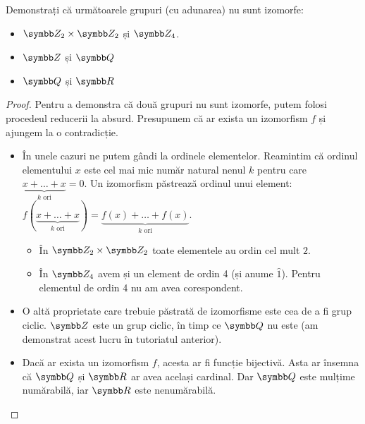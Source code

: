 \begin{exercise}
Demonstrați că următoarele grupuri (cu adunarea) nu sunt izomorfe:
\begin{itemize}
    \item \(\integersmod{2} \times \integersmod{2}\) și \(\integersmod{4}\).
    \item \(\integers\) și \(\rationals\)
    \item \(\rationals\) și \(\reals\)
\end{itemize}
\end{exercise}
\begin{proof}
Pentru a demonstra că două grupuri nu sunt izomorfe, putem folosi procedeul reducerii la absurd. Presupunem că ar exista un izomorfism \(f\) și ajungem la o contradicție.
\begin{itemize}
    \item În unele cazuri ne putem gândi la ordinele elementelor. Reamintim că ordinul elementului \(x\) este cel mai mic număr natural nenul \(k\) pentru care \(\underbrace{x + \dots + x}_{k \text{ ori}} = 0\). Un izomorfism păstrează ordinul unui element: \(f(\underbrace{x + \dots + x}_{k \text{ ori}}) = \underbrace{f(x) + \dots + f(x)}_{k \text{ ori}}\).
        \begin{itemize}
            \item În \(\integersmod{2} \times \integersmod{2}\) toate elementele au ordin cel mult \(2\).
            \item În \(\integersmod{4}\) avem și un element de ordin 4 (și anume \(\widehat{1}\)). Pentru elementul de ordin 4 nu am avea corespondent.
        \end{itemize}

    \item O altă proprietate care trebuie păstrată de izomorfisme este cea de a fi grup ciclic. \(\integers\) este un grup ciclic, în timp ce \(\rationals\) nu este (am demonstrat acest lucru în tutoriatul anterior).
    
    \item Dacă ar exista un izomorfism \(f\), acesta ar fi funcție bijectivă. Asta ar însemna că \(\rationals\) și \(\reals\) ar avea același cardinal. Dar \(\rationals\) este mulțime numărabilă, iar \(\reals\) este nenumărabilă.
\end{itemize}
\end{proof}

\pagebreak

